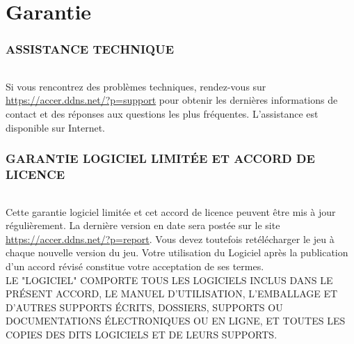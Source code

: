 \documentclass[titlepage, 11px, a4paper]{report}
\begin{document}
\AddToShipoutPicture*{\BackgroundPic}

\maketitle
\tableofcontents


\part{Garantie} 

\section*{ASSISTANCE TECHNIQUE}
\paragraph*{} \hspace{0pt}
Si vous rencontrez des problèmes techniques, rendez-vous sur 
\url{https://accer.ddns.net/?p=support} pour obtenir les dernières informations de 
contact et des réponses aux questions les plus fréquentes. L'assistance est
disponible sur Internet. \\

\section*{GARANTIE LOGICIEL LIMITÉE ET ACCORD DE LICENCE}
\paragraph*{} \hspace{0pt}
Cette garantie logiciel limitée et cet accord de licence peuvent être mis à
jour régulièrement. La dernière version en date sera postée sur le site 
\url{https://accer.ddns.net/?p=report}. Vous devez toutefois retélécharger le 
jeu à chaque nouvelle version du jeu. Votre utilisation du Logiciel après la
publication d'un accord révisé constitue votre acceptation de ses termes. \\

LE "LOGICIEL" COMPORTE TOUS LES LOGICIELS INCLUS DANS LE PRÉSENT ACCORD, LE 
MANUEL D'UTILISATION, L'EMBALLAGE ET D'AUTRES SUPPORTS ÉCRITS, DOSSIERS,
SUPPORTS OU DOCUMENTATIONS ÉLECTRONIQUES OU EN LIGNE, ET TOUTES LES COPIES
DES DITS LOGICIELS ET DE LEURS SUPPORTS. \\
\end{document}
